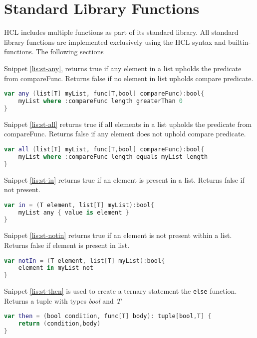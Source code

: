 \section{Standard Library Functions}
\label{standardLib}
HCL includes multiple functions as part of its standard library.
All standard library functions are implemented exclusively using the HCL syntax and builtin-functions. 
The following sections

Snippet \ref{lis:st-any}, returns true if any element in a list upholds the predicate from compareFunc. 
Returns false if no element in list upholds compare predicate.
\begin{lstlisting}[language=Kotlin,label=lis:st-any,caption=\texttt{any} function.]
var any (list[T] myList, func[T,bool] compareFunc):bool{
	myList where :compareFunc length greaterThan 0
}
\end{lstlisting}

Snippet \ref{lis:st-all} returns true if all elements in a list upholds the predicate from compareFunc. 
Returns false if any element does not uphold compare predicate.
\begin{lstlisting}[language=Kotlin,label=lis:st-all,caption=\texttt{all} function.]
var all (list[T] myList, func[T,bool] compareFunc):bool{
	myList where :compareFunc length equals myList length
}
\end{lstlisting}

Snippet \ref{lis:st-in} returns true if an element is present in a list. 
Returns false if not present. 
\begin{lstlisting}[language=Kotlin,label=lis:st-in,caption=\texttt{in} function.]
var in = (T element, list[T] myList):bool{
	myList any { value is element }
}
\end{lstlisting}

Snippet \ref{lis:st-notin} returns true if an element is not present within a list. 
Returns false if element is present in list. 
\begin{lstlisting}[language=Kotlin,label=lis:st-notin,caption=\texttt{notIn} function.]
var notIn = (T element, list[T] myList):bool{
	element in myList not
}
\end{lstlisting}

Snippet \ref{lis:st-then} is used to create a ternary statement the \texttt{else} function. 
Returns a tuple with types \textit{bool} and \textit{T}
\begin{lstlisting}[language=Kotlin,label=lis:st-then,caption=\texttt{then} function.]
var then = (bool condition, func[T] body): tuple[bool,T] {
	return (condition,body)
}
\end{lstlisting}

